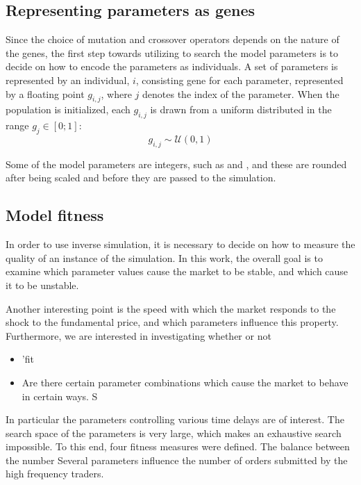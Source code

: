 \subsection{Representing parameters as genes}
Since the choice of mutation and crossover operators depends on the nature of the genes, the first step towards utilizing to search the model parameters is to decide on how to encode the parameters as individuals. 
A set of parameters is represented by an individual, $i$, consisting gene for each parameter, represented by a floating point $g_{i,j}$, where $j$ denotes the index of the parameter. When the population is initialized, each $g_{i,j}$ is drawn from a uniform distributed in the range $g_j \in [0;1]$:
\begin{equation}
g_{i,j} \sim \mathcal{U}(0,1)
\end{equation}


Some of the model parameters are integers, such as \ssmmnAgents{} and \scnAgents{}, and these are rounded after being scaled and before they are passed to the simulation.





\subsection{Model fitness}\label{section:simulation_fitness}

In order to use inverse simulation, it is necessary to decide on how to measure the quality of an instance of the simulation. In this work, the overall goal is to examine which parameter values cause the market to be stable, and which cause it to be unstable. 


Another interesting point is the speed with which the market responds to the shock to the fundamental price, and which parameters influence this property. Furthermore, we are interested in investigating whether or not 

\begin{itemize}
\item 'fit
\item Are there certain parameter combinations which cause the market to behave in certain ways. S
\end{itemize}
In particular the parameters controlling various time delays are of interest. 
The search space of the parameters is very large, which makes an exhaustive search impossible.
To this end, four fitness measures were defined.
The balance between the number 
Several parameters influence the number of orders submitted by the high frequency traders.

